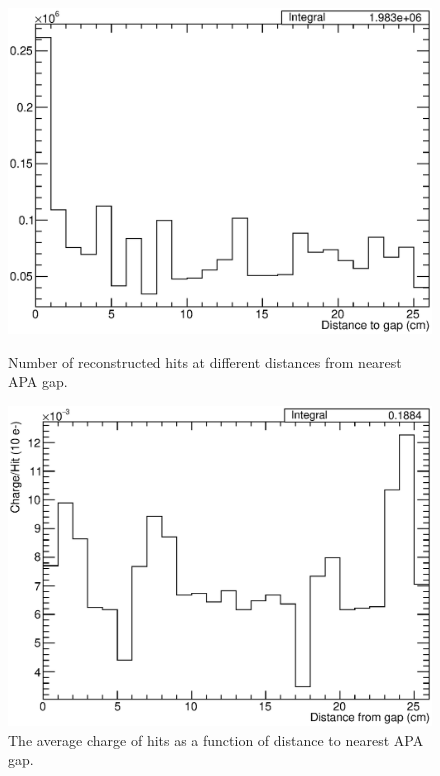 \begin{figure}
  \centering
  \includegraphics[width=12cm]{HitGapDistance.eps}
  \caption[Number of reconstructed hits at different distances from nearest APA gap.]{Number of reconstructed hits at different distances from nearest APA gap.}
  \label{fig:HitGapDistance}
  \vspace{1cm}
  \includegraphics[width=12cm]{ChargeHit.eps}
  \caption[The average charge of hits as a function of distance to nearest APA gap.]{The average charge of hits as a function of distance to nearest APA gap.}
  \label{fig:ChargeHit}
\end{figure}

